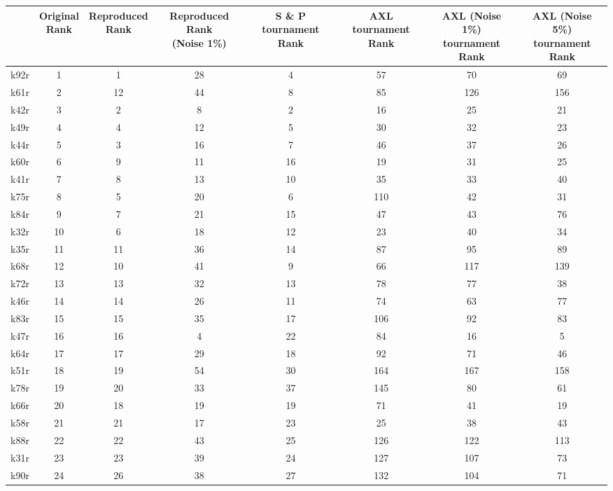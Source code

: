 \begin{tabular}{lccccccc}
\toprule
 & \makecell[c]{Original\\Rank} & \makecell[c]{Reproduced\\Rank} & \makecell[c]{Reproduced Rank\\(Noise 1\%)} & \makecell[c]{S \& P\\tournament Rank} & \makecell[c]{AXL\\tournament Rank} & \makecell[c]{AXL (Noise 1\%)\\tournament Rank} & \makecell[c]{AXL (Noise 5\%)\\tournament Rank} \\
\midrule
k92r & 1 & 1 & 28 & 4 & 57 & 70 & 69 \\
k61r & 2 & 12 & 44 & 8 & 85 & 126 & 156 \\
k42r & 3 & 2 & 8 & 2 & 16 & 25 & 21 \\
k49r & 4 & 4 & 12 & 5 & 30 & 32 & 23 \\
k44r & 5 & 3 & 16 & 7 & 46 & 37 & 26 \\
k60r & 6 & 9 & 11 & 16 & 19 & 31 & 25 \\
k41r & 7 & 8 & 13 & 10 & 35 & 33 & 40 \\
k75r & 8 & 5 & 20 & 6 & 110 & 42 & 31 \\
k84r & 9 & 7 & 21 & 15 & 47 & 43 & 76 \\
k32r & 10 & 6 & 18 & 12 & 23 & 40 & 34 \\
k35r & 11 & 11 & 36 & 14 & 87 & 95 & 89 \\
k68r & 12 & 10 & 41 & 9 & 66 & 117 & 139 \\
k72r & 13 & 13 & 32 & 13 & 78 & 77 & 38 \\
k46r & 14 & 14 & 26 & 11 & 74 & 63 & 77 \\
k83r & 15 & 15 & 35 & 17 & 106 & 92 & 83 \\
k47r & 16 & 16 & 4 & 22 & 84 & 16 & 5 \\
k64r & 17 & 17 & 29 & 18 & 92 & 71 & 46 \\
k51r & 18 & 19 & 54 & 30 & 164 & 167 & 158 \\
k78r & 19 & 20 & 33 & 37 & 145 & 80 & 61 \\
k66r & 20 & 18 & 19 & 19 & 71 & 41 & 19 \\
k58r & 21 & 21 & 17 & 23 & 25 & 38 & 43 \\
k88r & 22 & 22 & 43 & 25 & 126 & 122 & 113 \\
k31r & 23 & 23 & 39 & 24 & 127 & 107 & 73 \\
k90r & 24 & 26 & 38 & 27 & 132 & 104 & 71 \\

\end{tabular}
